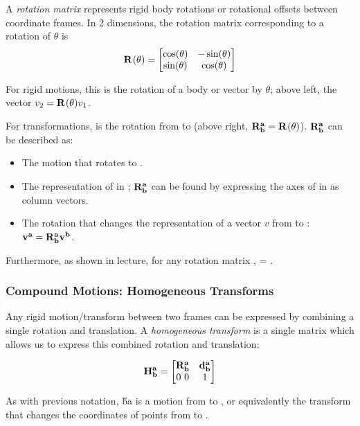 \documentclass{16384_doc}
\begin{document}
A \emph{rotation matrix} \R{}{} represents rigid body rotations or rotational
offsets between coordinate frames.  In 2 dimensions, the rotation matrix
corresponding to a rotation of $\theta$ is
$$
\mathbf{R_{}^{}}(\theta) = \begin{bmatrix}\cos(\theta)&-\sin(\theta)\\\sin(\theta)&\cos(\theta)\end{bmatrix}
$$

For rigid motions, this is the rotation of a body or vector by $\theta$; above
left, the vector $v_2 = \mathbf{R_{}^{}}(\theta) v_1$.

For transformations,  is the rotation from  to  (above
right, $\mathbf{R_{b}^{a}} = \mathbf{R_{}^{}}(\theta)$). $\mathbf{R_{b}^{a}}$ can be described as:
\begin{itemize}
  \item The motion that rotates  to .
  \item The representation of  in ; $\mathbf{R_{b}^{a}}$ can be found by
    expressing the axes of  in  as column vectors.
  \item The rotation that changes the representation of a vector $v$ from
     to : $\mathbf{v_{}^{a}} = \mathbf{R_{b}^{a}} \mathbf{v_{}^{b}}$.
\end{itemize}

\vspace{0.2in}
Furthermore, as shown in lecture, for any
rotation matrix ,  = .

\subsubsection{Compound Motions: Homogeneous Transforms}

Any rigid motion/transform between two frames can be expressed by combining a
single rotation and translation.  A \emph{homogeneous transform} is a single
matrix which allows us to express this combined rotation and translation:

$$
\mathbf{H_{b}^{a}} = \begin{bmatrix}\mathbf{R_{b}^{a}}&\mathbf{d_{b}^{a}}\\0~0&1\end{bmatrix}
$$

As with previous notation, \H{b}{a} is a motion from  to , or
equivalently the transform that changes the coordinates of points from 
to .
\end{document}
